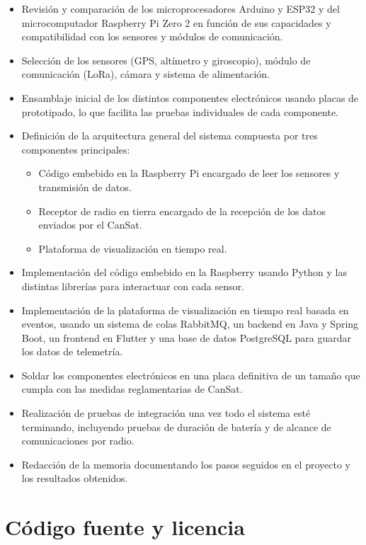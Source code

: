 \begin{itemize}
    \item Revisión y comparación de los microprocesadores Arduino y ESP32 y del microcomputador Raspberry Pi Zero 2 en función de sus capacidades y compatibilidad con los sensores y módulos de comunicación.
    \item Selección de los sensores (GPS, altímetro y giroscopio), módulo de comunicación (LoRa), cámara y sistema de alimentación.
    \item Ensamblaje inicial de los distintos componentes electrónicos usando placas de prototipado, lo que facilita las pruebas individuales de cada componente.
    \item Definición de la arquitectura general del sistema compuesta por tres componentes principales:
    \begin{itemize}
        \item Código embebido en la Raspberry Pi encargado de leer los sensores y transmisión de datos.
        \item Receptor de radio en tierra encargado de la recepción de los datos enviados por el CanSat.
        \item Plataforma de visualización en tiempo real.
    \end{itemize}
    \item Implementación del código embebido en la Raspberry usando Python y las distintas librerías para interactuar con cada sensor.
    \item Implementación de la plataforma de visualización en tiempo real basada en eventos, usando un sistema de colas RabbitMQ, un backend en Java y Spring Boot, un frontend en Flutter y una base de datos PostgreSQL para guardar los datos de telemetría.
    \item Soldar los componentes electrónicos en una placa definitiva de un tamaño que cumpla con las medidas reglamentarias de CanSat.
    \item Realización de pruebas de integración una vez todo el sistema esté terminando, incluyendo pruebas de duración de batería y de alcance de comunicaciones por radio.
    \item Redacción de la memoria documentando los pasos seguidos en el proyecto y los resultados obtenidos.
\end{itemize}


\section{Código fuente y licencia}

